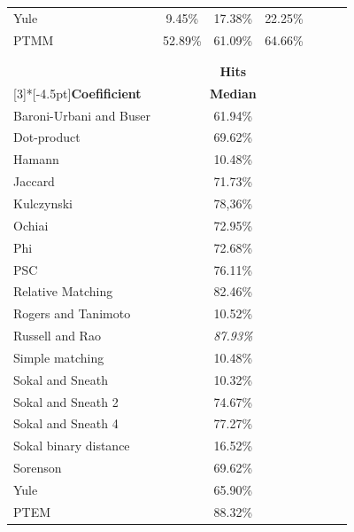 \documentclass[smallextended,natbib]{svjour3}
\begin{document}
{\begin{table}[tbp]
\begin{tabular}{lcccccc}
    \rowcolor{gray!15}Yule & 9.45\% & 17.38\% & 22.25\% \\[-0.0110cm]
    \rowcolor{mycolor}PTMM & 52.89\% & 61.09\% & 64.66\% \\[-0.0110cm]
\hline
    \multicolumn{4}{c}{} \\    \hline
    \rowcolor{gray!50}\multicolumn{4}{c}{\textbf{EXTRACT METHOD}} \\
    \hline
    \rowcolor{gray!25} & \multicolumn{3}{c}{\textbf{Hits}} \\
    \rowcolor{gray!25}\multirow{-2}[3]{*}[-4.5pt]{\textbf{Coefificient}} & \multicolumn{3}{c}{\textbf{Median}} \\
    Baroni-Urbani and Buser & \multicolumn{3}{c}{61.94\%} \\[-0.0110cm]
    \rowcolor{gray!15}Dot-product & \multicolumn{3}{c}{69.62\%} \\[-0.0110cm]
    Hamann & \multicolumn{3}{c}{10.48\%} \\[-0.0110cm]
    \rowcolor{gray!15}Jaccard & \multicolumn{3}{c}{71.73\%} \\[-0.0110cm]
    Kulczynski & \multicolumn{3}{c}{78,36\%} \\[-0.0110cm]
    \rowcolor{gray!15}Ochiai & \multicolumn{3}{c}{72.95\%} \\[-0.0110cm]
    Phi & \multicolumn{3}{c}{72.68\%} \\[-0.0110cm]
    \rowcolor{gray!15}PSC & \multicolumn{3}{c}{76.11\%} \\[-0.0110cm]
    Relative Matching & \multicolumn{3}{c}{82.46\%} \\[-0.0110cm]
    \rowcolor{gray!15}Rogers and Tanimoto & \multicolumn{3}{c}{10.52\%} \\[-0.0110cm]
    Russell and Rao & \multicolumn{3}{c}{\textit{87.93\%}} \\[-0.0110cm]
    \rowcolor{gray!15}Simple matching & \multicolumn{3}{c}{10.48\%} \\[-0.0110cm]
    Sokal and Sneath & \multicolumn{3}{c}{10.32\%} \\[-0.0110cm]
    \rowcolor{gray!15}Sokal and Sneath 2 & \multicolumn{3}{c}{74.67\%} \\[-0.0110cm]
    Sokal and Sneath 4 & \multicolumn{3}{c}{77.27\%} \\[-0.0110cm]
    \rowcolor{gray!15}Sokal binary distance & \multicolumn{3}{c}{16.52\%} \\[-0.0110cm]
    Sorenson & \multicolumn{3}{c}{69.62\%} \\[-0.0110cm]
    \rowcolor{gray!15}Yule & \multicolumn{3}{c}{65.90\%} \\[-0.0110cm]
    \rowcolor{mycolor}PTEM & \multicolumn{3}{c}{88.32\%} \\[-0.0110cm]    \hline
    \end{tabular}%
  \label{tab:anal2}%
  \vspace*{-8pt}
\end{table}%

}
\end{document}
